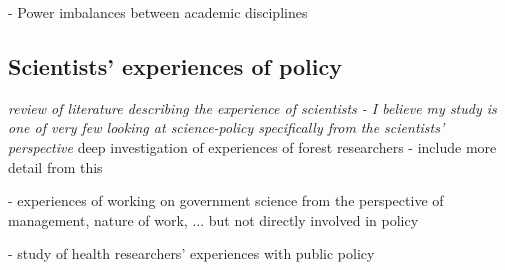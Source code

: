 \cite{BalvaneraJNOBCDGGKKMPSSW2020} - Power imbalances between academic disciplines

\subsection{Scientists’ experiences of policy}\label{sec:experiences}
\emph{review of literature describing the experience of scientists - I believe my study is one of very few looking at science-policy specifically from the scientists’ perspective}
\cite{OjanenBKP2021} deep investigation of experiences of forest researchers  - include more detail from this

\cite{DanfordDR2009} - experiences of working on government science from the perspective of management, nature of work, ... but not directly involved in policy

\cite{KothariME2009} - study of health researchers' experiences with public policy




